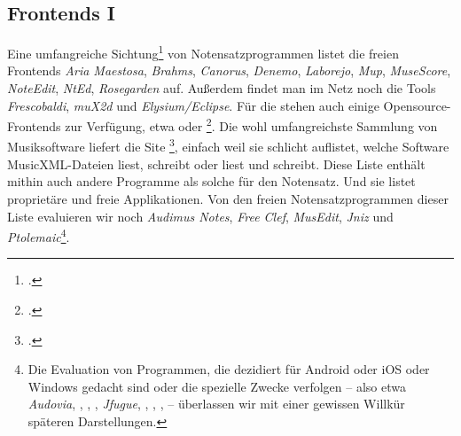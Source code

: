 %
%
%



\subsection{Frontends I}

Eine umfangreiche Sichtung\footcite[vgl.][\nopage wp]{WpedNotensatz2019a} von
Notensatzprogrammen listet die freien Frontends \textit{Aria Maestosa},
\textit{Brahms}, \textit{Canorus}, \textit{Denemo}, \textit{Laborejo},
\textit{Mup}, \textit{MuseScore}, \textit{NoteEdit}, \textit{NtEd},
\textit{Rosegarden} auf. Außerdem findet man im Netz noch die Tools
\textit{Frescobaldi}, \textit{muX2d} und \textit{Elysium/Eclipse}.
Für die  stehen auch einige Opensource-Frontends zur
Verfügung, etwa  oder \footcite[vgl.][\nopage
wp]{Abc2018b}. Die wohl umfangreichste Sammlung von Musiksoftware liefert die
Site \footcite[vgl.][\nopage wp]{MusicXML2018b}, einfach weil sie
schlicht auflistet, welche Software MusicXML-Dateien liest, schreibt oder liest
und schreibt. Diese Liste enthält mithin auch andere Programme als solche für
den Notensatz. Und sie listet proprietäre und freie Applikationen. Von den
freien Notensatzprogrammen dieser Liste evaluieren wir noch 
\textit{Audimus Notes}, \textit{Free Clef}, \textit{MusEdit}, \textit{Jniz} und
\textit{Ptolemaic}\footnote{Die Evaluation von Programmen, die dezidiert für
Android oder iOS oder Windows gedacht sind oder die spezielle Zwecke verfolgen
-- also etwa \textit{Audovia}, , , ,
\textit{Jfugue}, , , ,
 -- überlassen wir mit einer gewissen Willkür späteren
Darstellungen.}.


